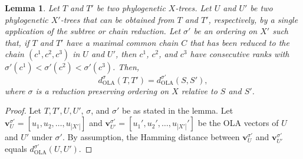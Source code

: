 \documentclass{article}
\newtheorem{lemma}{Lemma}
\newcommand{\OLA}{\mathrm{OLA}}
\begin{document}
\begin{lemma}\label{l:OLA-reduction}
    Let $T$ and $T'$ be two phylogenetic $X$-trees. Let $U$ and $U'$ be two  phylogenetic $X'$-trees that can be obtained from $T$ and $T'$, respectively, by a single application of the subtree or chain reduction. Let $\sigma'$ be an ordering on $X'$ such that, if $T$ and $T'$ have a maximal common chain $C$ that has been reduced to the chain  $(c^1,c^2,c^3)$ in $U$ and $U'$, then $c^1$, $c^2$, and $c^3$ have consecutive ranks with $\sigma'(c^1) < \sigma'(c^2) < \sigma'(c^3)$. Then, 
       \[d^{\sigma}_\OLA(T,T') = d^{\sigma'}_\OLA(S,S'), \]
    where $\sigma$ is a reduction preserving ordering on $X$ relative to $S$ and $S'$.
 \end{lemma}

\begin{proof}
    Let $T, T', U, U'$, $\sigma$, and $\sigma'$ be as stated in the lemma. Let $\mathbf{v}^{\sigma'}_U = [u_1, u_2, \ldots, u_{|X'|}]$ and $\mathbf{v}^{\sigma'}_{U'} = [u_1', u_2', \ldots, u_{|X'|}']$ be the OLA vectors of $U$ and $U'$ under $\sigma'$. By assumption, the Hamming distance between $\mathbf{v}^{\sigma'}_U$ and $\mathbf{v}^{\sigma'}_{U'}$ equals $d^{\sigma'}_\OLA(U,U')$. 


\end{proof}
\end{document}
